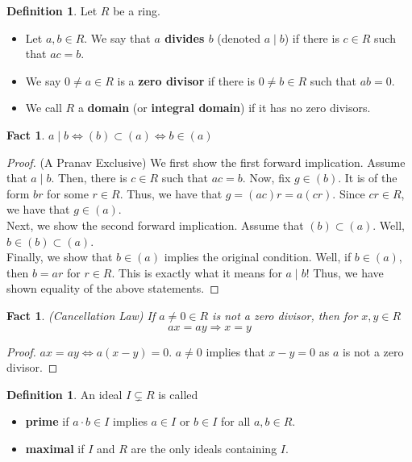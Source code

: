 \documentclass{amsart}
\newtheorem{fact}[thm]{Fact}
\theoremstyle{definition}
\newtheorem{defn}[thm]{Definition}
\theoremstyle{remark}
\begin{document}
\begin{defn}
    Let $R$ be a ring.
    \begin{itemize}
        \item Let $a,b \in R$. We say that \textbf{$a$ divides $b$} (denoted $a \mid b$)
        if there is $c \in R$ such that $ac = b$.
        \item We say $0 \neq a \in R$ is a \textbf{zero divisor} if there is
        $0 \neq b \in R$ such that $ab = 0$.
        \item We call $R$ a \textbf{domain} (or \textbf{integral domain}) if it has
        no zero divisors.
    \end{itemize}
\end{defn}
\begin{fact}
    $a \mid b \iff (b) \subset (a) \iff b \in (a)$
\end{fact}
\begin{proof} (A Pranav Exclusive)
    We first show the first forward implication. Assume that $a \mid b$. Then, there is
    $c \in R$ such that $ac = b$. Now, fix $g \in (b)$. It is of the form $br$ for some
    $r \in R$. Thus, we have that $g = (ac)r = a(cr)$. Since $cr \in R$, we have that $g \in (a)$. \\
    Next, we show the second forward implication. Assume that $(b) \subset (a)$. Well,
    $b \in (b) \subset (a)$. \\
    Finally, we show that $b \in (a)$ implies the original condition. Well, if $b \in (a)$, then
    $b = ar$ for $r \in R$. This is exactly what it means for $a \mid b$! Thus, we have
    shown equality of the above statements.
\end{proof}
\begin{fact} (Cancellation Law) If $a \neq 0 \in R$ is not a zero divisor, then
    for $x,y \in R$
    $$
    ax = ay \Rightarrow x = y
    $$
\end{fact}
\begin{proof}
    $ax = ay \iff a(x - y) = 0$. $a \neq 0$ implies that $x - y = 0$ as $a$ is not
    a zero divisor.
\end{proof}
\begin{defn}
    An ideal $I \subsetneq R$ is called
    \begin{itemize}
        \item \textbf{prime} if $a \cdot b \in I$ implies $a \in I$ or $b \in I$ for all $a,b \in R$.
        \item \textbf{maximal} if $I$ and $R$ are the only ideals containing $I$.
    \end{itemize}
\end{defn}
\end{document}
